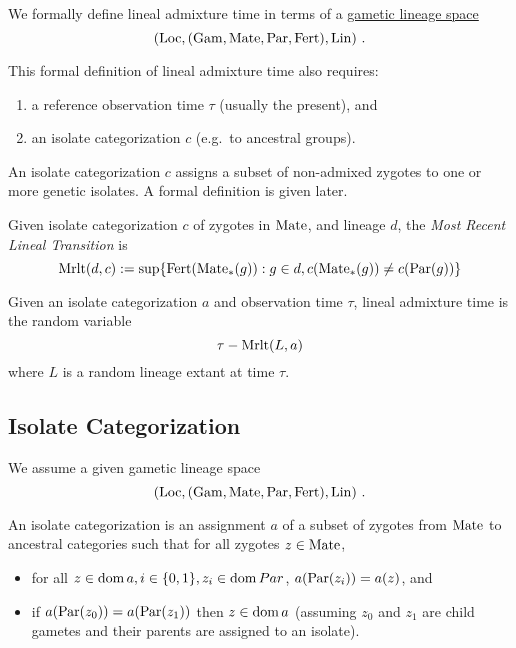 We formally define lineal admixture time in terms of a
\href{https://popgen.es/0iV47kWzQAuyONrIDG538k3x3Qc/0.3/}{gametic
lineage space}
\cite{dsi:0i/0.3}
\[
(\mathrm{Loc}, (\mathrm{Gam}, \mathrm{Mate}, \mathrm{Par}, \mathrm{Fert}), \mathrm{Lin})
\text{ .}
\]

This formal definition of lineal admixture time also requires:

\begin{enumerate}
\item
  a reference observation time \(\tau\) (usually the present), and
\item
  an isolate categorization \(c\) (e.g.~to ancestral groups).
\end{enumerate}

An isolate categorization \(c\) assigns a subset of non-admixed zygotes
to one or more genetic isolates. A formal definition is given later.

Given isolate categorization \(c\) of zygotes in \(\mathrm{Mate}\), and lineage
\(d\), the \emph{Most Recent Lineal Transition} is
$$
\mathrm{Mrlt}(d,c) := \sup\{ \mathrm{Fert}(\mathrm{Mate}_*(g)) : g \in d, c(\mathrm{Mate}_*(g)) \not= c(\mathrm{Par}(g)) \}
$$

Given an isolate categorization \(a\) and observation time \(\tau\),
lineal admixture time is the random variable
$$
\tau - \mathrm{Mrlt}(L, a)
$$
where $L$ is a random lineage extant at time $\tau$.


\subsection{Isolate Categorization}

We assume a given gametic lineage space
$$
(\mathrm{Loc}, (\mathrm{Gam}, \mathrm{Mate}, \mathrm{Par}, \mathrm{Fert}), \mathrm{Lin})
\text{ .}
$$

An isolate categorization is an assignment $a$ of a subset of zygotes
from $\mathrm{Mate}$ to ancestral categories such that for all zygotes
$z \in \mathrm{Mate}$,

\begin{itemize}
\item
  for all \(z \in \operatorname{dom}{ a}, i \in \{0, 1\}, z_i \in \operatorname{dom}{ Par}\),
  \(a(\mathrm{Par}(z_i)) = a(z)\), and
\item
  if \(a(\mathrm{Par}(z_0)) = a(\mathrm{Par}(z_1))\) then \(z \in \operatorname{dom}{ a}\) (assuming
  \(z_0\) and \(z_1\) are child gametes and their parents are assigned
  to an isolate).
\end{itemize}


\printbibliography %

